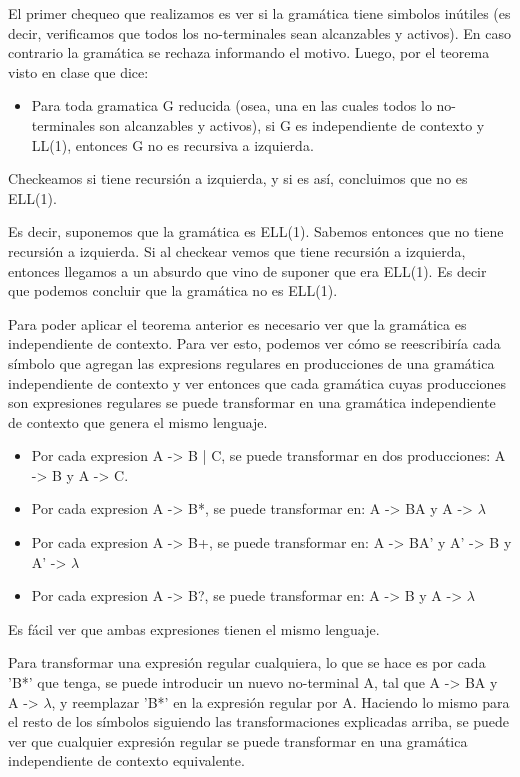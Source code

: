 \documentclass[a4paper]{report}
\begin{document}
El primer chequeo que realizamos es ver si la gramática tiene simbolos inútiles (es
decir, verificamos que todos los no-terminales sean alcanzables y activos). En caso contrario
la gramática se rechaza informando el motivo. Luego, por el teorema visto en clase que dice:
\begin{itemize}
\item Para toda gramatica G reducida (osea, una en las cuales todos lo
	no-terminales son alcanzables y activos), si G es independiente de contexto
	y LL(1), entonces G no es recursiva a izquierda.
\end{itemize}


Checkeamos si tiene recursión a izquierda, y si es así, concluimos que no es
ELL(1).


Es decir, suponemos que la gramática es ELL(1). Sabemos entonces que no
tiene recursión a izquierda. Si al checkear vemos que tiene recursión a
izquierda, entonces llegamos a un absurdo que vino de suponer que era ELL(1). Es
decir que podemos concluir que la gramática no es ELL(1).


Para poder aplicar el teorema anterior es necesario ver que la gramática es
independiente de contexto. Para ver esto, podemos ver cómo se reescribiría cada
símbolo que agregan las expresions regulares en producciones de una gramática
independiente de contexto y ver entonces que cada gramática cuyas producciones
son expresiones regulares se puede transformar en una gramática independiente de
contexto que genera el mismo lenguaje.

\begin{itemize}
\item Por cada expresion A -> B | C, se puede transformar en dos producciones: A -> B
y A -> C.
\item Por cada expresion A -> B*, se puede transformar en: A -> BA y A -> $\lambda$
\item Por cada expresion A -> B+, se puede transformar en: A -> BA' y A' -> B y A' -> $\lambda$
\item Por cada expresion A -> B?, se puede transformar en: A -> B y A -> $\lambda$
\end{itemize}


Es fácil ver que ambas expresiones tienen el mismo lenguaje.


Para transformar una expresión regular cualquiera, lo que se hace es por cada
'B*' que tenga, se puede introducir un nuevo no-terminal A, tal que A -> BA y A
-> $\lambda$, y reemplazar 'B*' en la expresión regular por A. Haciendo lo mismo para el
resto de los símbolos siguiendo las transformaciones explicadas arriba, se puede
ver que cualquier expresión regular se puede transformar en una gramática
independiente de contexto equivalente.
\end{document}

